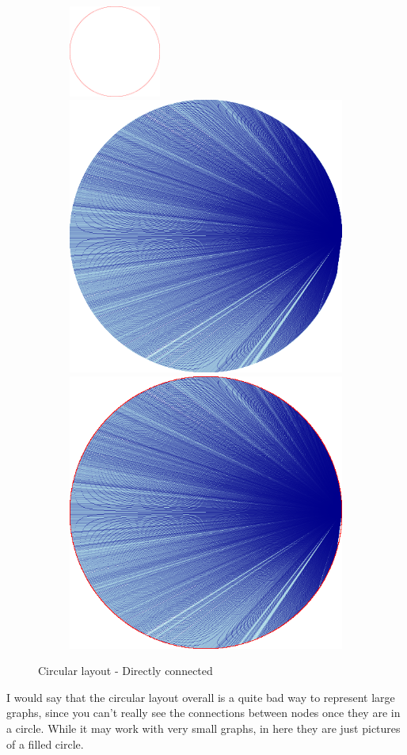 \documentclass[12pt, a4paper]{article}
\begin{document}
\begin{figure}[H]
    \centering
    \begin{subfigure}[b]{\textwidth}
        \centering
        \includegraphics[width=0.33\textwidth]{src/youtube/datashader/simple/datashader/2_1}%
        \hfill
        \includegraphics[width=0.33\columnwidth]{src/youtube/datashader/simple/datashader/2_2}%
        \hfill
        \includegraphics[width=0.33\columnwidth]{src/youtube/datashader/simple/datashader/2_3}
    \end{subfigure}
    \caption{Circular layout - Directly connected}
    \label{fig:ds_show_2}
\end{figure}

I would say that the circular layout overall is a quite bad way to represent large graphs, since you can't really see the connections between nodes once they are in a circle. While it may work with very small graphs, in here they are just pictures of a filled circle.
\end{document}
